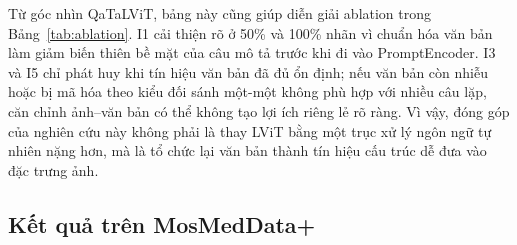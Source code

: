 Từ góc nhìn QaTaLViT, bảng này cũng giúp diễn giải ablation trong Bảng~\ref{tab:ablation}. I1 cải thiện rõ ở 50\% và 100\% nhãn vì chuẩn hóa văn bản làm giảm biến thiên bề mặt của câu mô tả trước khi đi vào PromptEncoder. I3 và I5 chỉ phát huy khi tín hiệu văn bản đã đủ ổn định; nếu văn bản còn nhiễu hoặc bị mã hóa theo kiểu đối sánh một-một không phù hợp với nhiều câu lặp, căn chỉnh ảnh--văn bản có thể không tạo lợi ích riêng lẻ rõ ràng. Vì vậy, đóng góp của nghiên cứu này không phải là thay LViT bằng một trục xử lý ngôn ngữ tự nhiên nặng hơn, mà là tổ chức lại văn bản thành tín hiệu cấu trúc dễ đưa vào đặc trưng ảnh.

\subsection{Kết quả trên MosMedData+}
\label{sec:multidataset}

